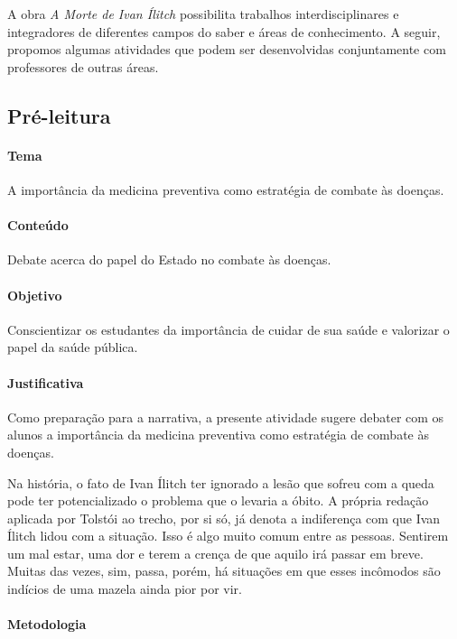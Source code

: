 \documentclass[12pt]{extarticle}
\begin{document}


A obra \emph{A Morte de Ivan Ílitch} possibilita trabalhos
interdisciplinares e integradores de diferentes campos do saber e áreas
de conhecimento. A seguir, propomos algumas atividades que podem ser
desenvolvidas conjuntamente com professores de outras áreas.

\subsection{Pré-leitura}

\paragraph{Tema} A importância da medicina preventiva como
estratégia de combate às doenças.

\paragraph{Conteúdo} Debate acerca do papel do Estado no combate às doenças.

\paragraph{Objetivo} Conscientizar os estudantes da importância de cuidar
de sua saúde e valorizar o papel da saúde pública.

\paragraph{Justificativa} Como preparação para a narrativa, a presente atividade
sugere debater com os alunos a importância da medicina preventiva como
estratégia de combate às doenças.

Na história, o fato de Ivan Ílitch ter ignorado
a lesão que sofreu com a queda pode ter potencializado o problema que o
levaria a óbito. A própria redação aplicada por Tolstói ao trecho, por
si só, já denota a indiferença com que Ivan Ílitch lidou com a situação.
Isso é algo muito comum entre as pessoas. Sentirem um mal estar, uma dor
e terem a crença de que aquilo irá passar em breve. Muitas das vezes,
sim, passa, porém, há situações em que esses incômodos são indícios de
uma mazela ainda pior por vir.

\paragraph{Metodologia}
\end{document}
